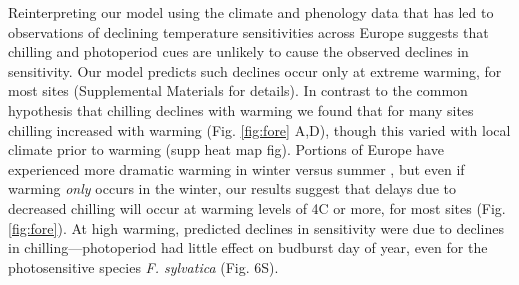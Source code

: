 \documentclass{article}
\begin{document}
\par Reinterpreting our model using the climate and phenology data that has led to observations of declining temperature sensitivities across Europe suggests that chilling and photoperiod cues are unlikely to cause the observed declines in sensitivity. Our model predicts such declines occur only at extreme warming, for most sites (Supplemental Materials for details). In contrast to the common hypothesis that chilling declines with warming we found that for many sites chilling increased with warming (Fig. \ref{fig:fore} A,D), though this varied with local climate prior to warming (supp heat map fig). %
Portions of Europe have experienced more dramatic warming in winter versus summer \cite{balling1998}, but even if warming \emph{only} occurs in the winter, our results suggest that delays due to decreased chilling will occur at warming levels of 4\degree C or more, for most sites (Fig. \ref{fig:fore}). At high warming, predicted declines in sensitivity were due to declines in chilling---photoperiod had little effect on budburst day of year, even for the photosensitive species \emph{F. sylvatica} (Fig. 6S). %
\end{document}
